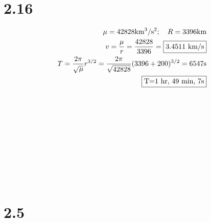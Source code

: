\documentclass[12 pt]{article}
\begin{document}
\section*{2.16}
\begin{align*}
    \mu=42828\textrm{km$^3$/s$^2$};\quad R=3396\textrm{km} \\
    v=\frac{\mu}{r}=\frac{42828}{3396}=\fbox{$3.4511$ km/s} \\
    T=\frac{2\pi}{\sqrt{\mu}}r^{3/2}=\frac{2\pi}{\sqrt{42828}}(3396+200)^{3/2}=6547\textrm{s} \\
    \fbox{T=1 hr, 49 min, 7s}
\end{align*}
\\ \\ \\ \\ \\ \\ \\ \\ \\
\section*{2.5}
\end{document}
